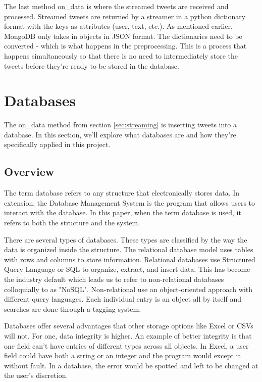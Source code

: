 \documentclass[11pt, twoside, reqno]{article}
\begin{document}
The last method on\_data is where the streamed tweets are received and processed.  Streamed tweets are returned by a streamer in a python dictionary format with the keys as attributes (user, text, etc.). As mentioned earlier, MongoDB only takes in objects in JSON format. The dictionaries need to be converted - which is what happens in the preprocessing.  This is a process that happens simultaneously so that there is no need to intermediately store the tweets before they're ready to be stored in the database. 

\section{Databases}
\hspace{0.2in} The on\_data method from section \ref{sec:streaming} is inserting tweets into a database. In this section, we'll explore what databases are and how they're specifically applied in this project.
\subsection{Overview}
The term database refers to any structure that electronically stores data. In extension, the Database Management System is the program that allows users to interact with the database. In this paper, when the term database is used, it refers to both the structure and the system. 

There are several types of databases. These types are classified by the way the data is organized inside the structure. The relational database model uses tables with rows and columns to store information. Relational databases use Structured Query Language or SQL to organize, extract, and insert data. This has become the industry default which leads us to refer to non-relational databases colloquially to as "NoSQL". Non-relational use an object-oriented approach with different query languages. Each individual entry is an object all by itself and searches are done through a tagging system. 

Databases offer several advantages that other storage options like Excel or CSVs will not. For one, data integrity is higher. An example of better integrity is that one field can't have entries of different types across all objects. In Excel, a user field could have both a string or an integer and the program would except it without fault. In a database, the error would be spotted and left to be changed at the user's discretion.
\end{document}
